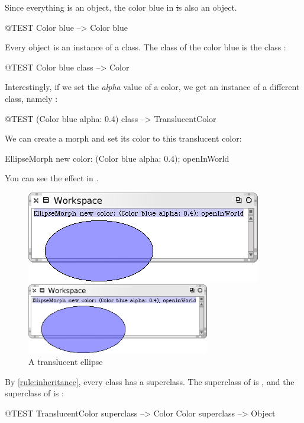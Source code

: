 \documentclass[a4paper,10pt,twoside]{book}
\begin{document}
Since everything is an object, the color blue in \st is also an object.
\begin{code}{@TEST}
Color blue --> Color blue
\end{code}

\noindent
Every object is an instance of a class. The class of the color blue is the class :
\begin{code}{@TEST}
Color blue class --> Color
\end{code}

\noindent
Interestingly, if we set the \emph{alpha} value of a color, we get an instance of a different class, namely :
\begin{code}{@TEST}
(Color blue alpha: 0.4) class --> TranslucentColor
\end{code}

\noindent
We can create a morph and set its color to this translucent color:
\begin{code}{}
EllipseMorph new color: (Color blue alpha: 0.4); openInWorld
\end{code}
\noindent
You can see the effect in .

\begin{center}
\begin{figure}[!ht]
\ifluluelse
	{\centerline {\includegraphics[scale=0.7]{TranslucentEllipse}}}
	{\centerline {\includegraphics[width=8cm]{TranslucentEllipse}}}
\caption{A translucent ellipse\label{fig:translucentEllipse}}
\end{figure}
\end{center}

By \ref{rule:inheritance}, every class has a superclass.
The superclass of  is , and the superclass of  is :
\begin{code}{@TEST}
TranslucentColor superclass --> Color
Color superclass                   --> Object
\end{code}
\end{document}
